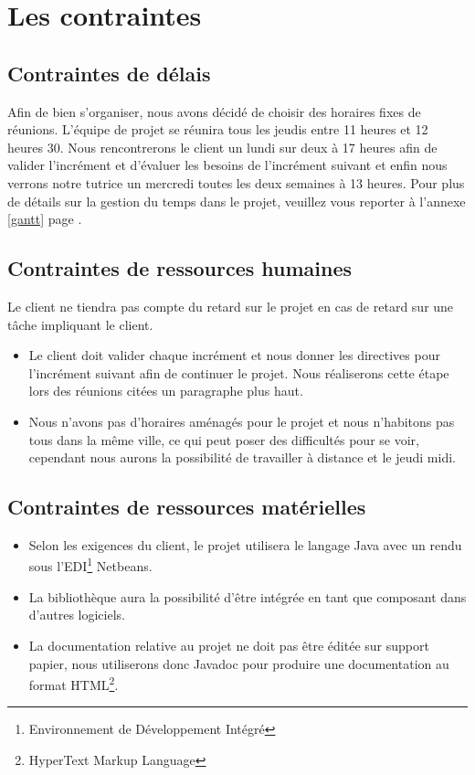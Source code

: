 \documentclass[12pt,a4paper,openany]{article}
\begin{document}
	\section{Les contraintes}
	\subsection{Contraintes de délais}
	Afin de bien s'organiser, nous avons décidé de choisir des horaires fixes de réunions. L'équipe de projet se réunira tous
	les jeudis entre 11 heures et 12 heures 30. Nous rencontrerons le client un lundi sur deux à 17 heures afin de valider l'incrément et d'évaluer les
	besoins de l'incrément suivant et enfin nous verrons notre tutrice un mercredi toutes les deux semaines à 13 heures. 
	Pour plus de détails sur la gestion du temps dans le projet, veuillez vous reporter à l'annexe \ref{gantt} page \pageref{gantt}.
	
	\subsection{Contraintes de ressources humaines}
	Le client ne tiendra pas compte du retard sur le projet en cas de retard sur une tâche impliquant le client. 
	\begin{itemize}
		\item Le client doit valider chaque incrément et nous donner les directives pour l'incrément suivant afin de continuer le projet. Nous réaliserons cette
			étape lors des réunions citées un paragraphe plus haut.
		\item Nous n'avons pas d'horaires aménagés pour le projet et nous n'habitons pas tous dans la même ville, ce qui peut poser des difficultés pour se voir, cependant nous aurons la possibilité de travailler à distance et le jeudi midi.
	\end{itemize}
	\subsection{Contraintes de ressources matérielles}
	\begin{itemize}
		\item Selon les exigences du client, le projet utilisera le langage Java avec un rendu sous l'EDI\footnote{Environnement de Développement Intégré} Netbeans. 
		\item La bibliothèque aura la possibilité d'être intégrée en tant que composant dans d'autres logiciels.
		\item La documentation relative au projet ne doit pas être éditée sur support papier, nous utili\-serons donc Javadoc pour produire une documentation 
			au format HTML\footnote{HyperText Markup Language}.  
	\end{itemize}
	
\end{document}
